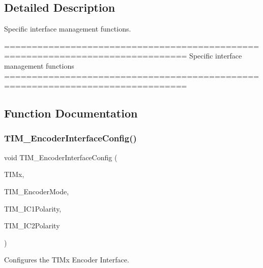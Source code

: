 \subsection{Detailed Description}
Specific interface management functions. 

\begin{DoxyVerb} ===============================================================================
                    Specific interface management functions
 ===============================================================================  \end{DoxyVerb}
 

\subsection{Function Documentation}
\mbox{\label{group___t_i_m___group8_ga0fc7e76c47a3bd1ba1ebc71427832b51}} 
\subsubsection{\texorpdfstring{T\+I\+M\+\_\+\+Encoder\+Interface\+Config()}{TIM\_EncoderInterfaceConfig()}}
{\footnotesize\ttfamily void T\+I\+M\+\_\+\+Encoder\+Interface\+Config (\begin{DoxyParamCaption}\item[{\hyperlink{struct_t_i_m___type_def}{T\+I\+M\+\_\+\+Type\+Def} $\ast$}]{T\+I\+Mx,  }\item[{uint16\+\_\+t}]{T\+I\+M\+\_\+\+Encoder\+Mode,  }\item[{uint16\+\_\+t}]{T\+I\+M\+\_\+\+I\+C1\+Polarity,  }\item[{uint16\+\_\+t}]{T\+I\+M\+\_\+\+I\+C2\+Polarity }\end{DoxyParamCaption})}



Configures the T\+I\+Mx Encoder Interface. 


